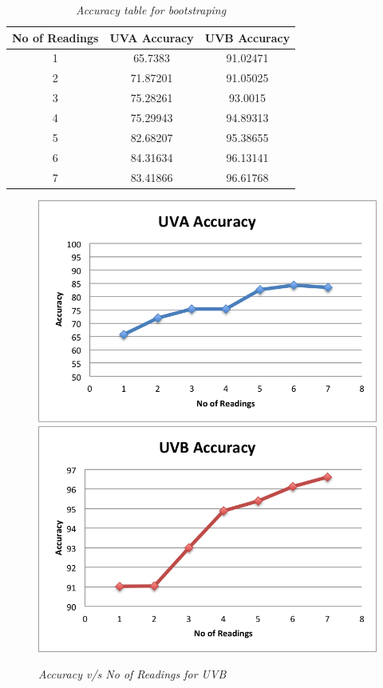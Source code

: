 \documentclass[12pt,fullpage,doublespace]{article}
\begin{document}
\newpage
\begin{table}
\centering
\begin{tabular}{|c|c|c|}
\hline
No of Readings & UVA Accuracy & UVB Accuracy \\
\hline 
1 & 65.7383 & 91.02471\\
\hline
2 & 71.87201 & 91.05025\\
\hline
3 & 75.28261 & 93.0015\\
\hline
4 & 75.29943 & 94.89313\\
\hline
5 & 82.68207 & 95.38655\\
\hline
6 & 84.31634 & 96.13141\\
\hline
7 & 83.41866 & 96.61768\\
\hline
\end{tabular}
\caption{\small \sl Accuracy table for bootstraping}
\end{table}


\begin{figure}
\begin{center}
\includegraphics[scale=0.5]{segment4uva.png}
\includegraphics[scale=0.5]{segment4uvb.png}
\caption{\small \sl Accuracy v/s No of Readings for UVB}
\label{fig:lessReadings}
\end{center}
\end{figure}
\end{document}
